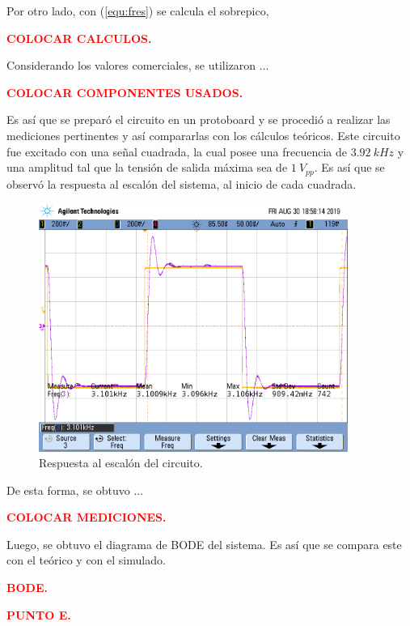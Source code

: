 \documentclass[11pt, a4paper]{article}
\begin{document}
Por otro lado, con (\ref{equ:fres}) se calcula el sobrepico,

\begin{center}
	\textcolor{red}{\textbf{COLOCAR CALCULOS.}}
\end{center}

Considerando los valores comerciales, se utilizaron ...

\begin{center}
	\textcolor{red}{\textbf{COLOCAR COMPONENTES USADOS.}}
\end{center}

Es así que se preparó el circuito en un protoboard y se procedió a realizar las mediciones pertinentes y así compararlas con los cálculos teóricos. Este circuito fue excitado con una señal cuadrada, la cual posee una frecuencia de $3.92 \ kHz$ y una amplitud tal que la tensión de salida máxima sea de $1 \ V_{pp}$. Es así que se observó la respuesta al escalón del sistema, al inicio de cada cuadrada.

\begin{figure}[H]
	\centering
	\includegraphics[width=0.9\textwidth, trim = {0 3.4cm 0.4cm 2cm},clip]{Ejercicio2/Mediciones/A/scope_0.png}
\caption{Respuesta al escalón del circuito.}
	\label{fig:rtaescalon}
\end{figure}

De esta forma, se obtuvo ...
\begin{center}
	\textcolor{red}{\textbf{COLOCAR MEDICIONES.}}
\end{center} 

Luego, se obtuvo el diagrama de BODE del sistema. Es así que se compara este con el teórico y con el simulado.

\begin{center}
	\textcolor{red}{\textbf{BODE.}}
\end{center}

\begin{center}
	\textcolor{red}{\textbf{PUNTO E.}}
\end{center}
\end{document}
